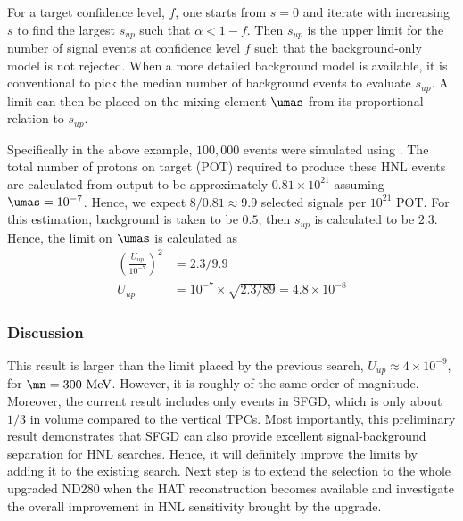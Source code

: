         For a target confidence level, $f$, one starts from $s=0$ and iterate with increasing $s$ to find the largest $s_{up}$ such that $\alpha < 1-f$. 
        Then $s_{up}$ is the upper limit for the number of signal events at confidence level $f$ such that the background-only model is not rejected. 
        When a more detailed background model is available, it is conventional to pick the median number of background events to evaluate $s_{up}$.
        A limit can then be placed on the mixing element $\umas$ from its proportional relation to $s_{up}$.

        Specifically in the above example, $100,000$ \genie events were simulated using . 
        The total number of protons on target (POT) required to produce these HNL events are calculated from  output to be approximately $0.81\times10^{21}$ assuming $\umas=10^{-7}$. 
        Hence, we expect $8/0.81\approx9.9$ selected signals per $10^{21}$ POT.
        For this estimation, background is taken to be $0.5$, then $s_{up}$ is calculated to be $2.3$. 
        Hence, the limit on $\umas$ is calculated as 
        \begin{align}
            (\frac{U_{up}}{10^{-7}})^2 & =  2.3 / 9.9 \\
            U_{up} & = 10^{-7} \times \sqrt{2.3/89} = 4.8\times10^{-8}
        \end{align}

        \subsubsection{Discussion}
        This result is larger than the limit placed by the previous search, $U_{up}\approx4\times10^{-9}$, for $\mn=300~\mev$. 
        However, it is roughly of the same order of magnitude. 
        Moreover, the current result includes only events in SFGD, which is only about $1/3$ in volume compared to the vertical TPCs. 
        Most importantly, this preliminary result demonstrates that SFGD can also provide excellent signal-background separation for HNL searches.
        Hence, it will definitely improve the limits by adding it to the existing search. 
        Next step is to extend the selection to the whole upgraded ND280 when the HAT reconstruction becomes available and investigate the overall improvement in HNL sensitivity brought by the upgrade. 
 